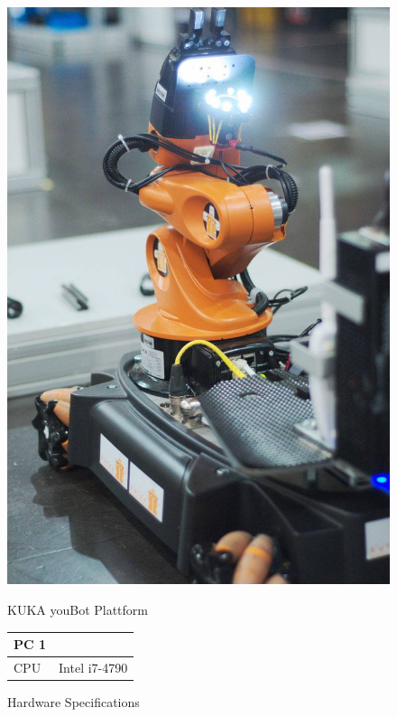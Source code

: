 \begin{figure}[htbp]
	\begin{minipage}{0.45\textwidth}
		\includegraphics[width=\textwidth]{img/YoubotInAction.jpg}
		\caption{KUKA youBot Plattform}
		\label{fig:youBot}
	\end{minipage}
	\hfill
	\begin{minipage}{0.45\textwidth}
		\renewcommand*\figurename{Tab.}
		\setcounter{figure}{0}
		\centering
		\caption{Hardware Specifications}
		\begin{tabular}{ | p{2cm} | p{3cm} | }
			\hline
			\bfseries{PC 1} &  \\
			\hline
			CPU & Intel i7-4790 \\

\end{tabular}
\end{minipage}
\end{figure}
